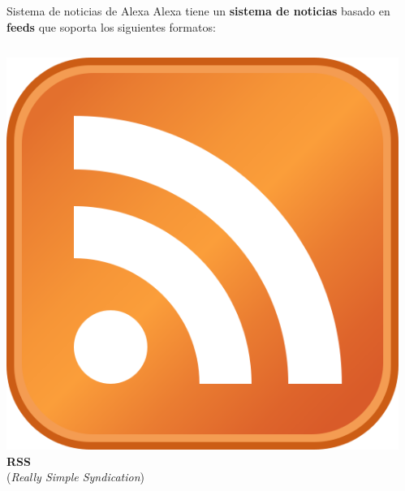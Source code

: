 \documentclass{beamer}
\begin{document}
  \begin{frame}{Sistema de noticias de Alexa}
    Alexa tiene un \textbf{sistema de noticias} basado en \textbf{feeds} que soporta los siguientes formatos:

    \vspace{2em}

    \begin{columns}[t]
      \begin{column}{.49\textwidth}
        \centering
        \includegraphics{rss-logo.png}\\[.5em]
        \textbf{RSS}\\{\footnotesize(\textit{Really Simple Syndication})}
      \end{column}
      \begin{column}{.49\textwidth}
        \centering

\end{column}
\end{columns}
\end{frame}
\end{document}
